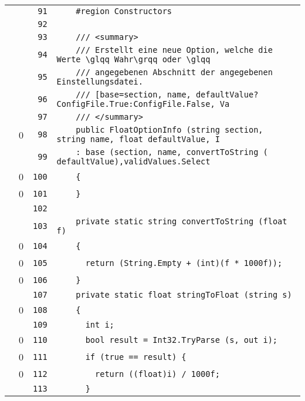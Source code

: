 \documentclass[a4paper,10pt]{article}
\begin{document}
\begin{longtable}[l]{lrrl}
\cellcolor{gray} &  & \verb~91~ & \verb~    #region Constructors~\\
\cellcolor{gray} &  & \verb~92~ & \verb~~\\
\cellcolor{gray} &  & \verb~93~ & \verb~    /// <summary>~\\
\cellcolor{gray} &  & \verb~94~ & \verb~    /// Erstellt eine neue Option, welche die Werte \glqq Wahr\grqq oder \glqq~\\
\cellcolor{gray} &  & \verb~95~ & \verb~    /// angegebenen Abschnitt der angegebenen Einstellungsdatei.~\\
\cellcolor{gray} &  & \verb~96~ & \verb~    /// [base=section, name, defaultValue?ConfigFile.True:ConfigFile.False, Va~\\
\cellcolor{gray} &  & \verb~97~ & \verb~    /// </summary>~\\
\cellcolor{red} & 0 & \verb~98~ & \verb~    public FloatOptionInfo (string section, string name, float defaultValue, I~\\
\cellcolor{gray} &  & \verb~99~ & \verb~    : base (section, name, convertToString ( defaultValue),validValues.Select ~\\
\cellcolor{red} & 0 & \verb~100~ & \verb~    {~\\
\cellcolor{red} & 0 & \verb~101~ & \verb~    }~\\
\cellcolor{gray} &  & \verb~102~ & \verb~~\\
\cellcolor{gray} &  & \verb~103~ & \verb~    private static string convertToString (float f)~\\
\cellcolor{red} & 0 & \verb~104~ & \verb~    {~\\
\cellcolor{red} & 0 & \verb~105~ & \verb~      return (String.Empty + (int)(f * 1000f));~\\
\cellcolor{red} & 0 & \verb~106~ & \verb~    }~\\
\cellcolor{gray} &  & \verb~107~ & \verb~    private static float stringToFloat (string s)~\\
\cellcolor{red} & 0 & \verb~108~ & \verb~    {~\\
\cellcolor{gray} &  & \verb~109~ & \verb~      int i;~\\
\cellcolor{red} & 0 & \verb~110~ & \verb~      bool result = Int32.TryParse (s, out i);~\\
\cellcolor{red} & 0 & \verb~111~ & \verb~      if (true == result) {~\\
\cellcolor{red} & 0 & \verb~112~ & \verb~        return ((float)i) / 1000f;~\\
\cellcolor{gray} &  & \verb~113~ & \verb~      }~\\

\end{longtable}
\end{document}
